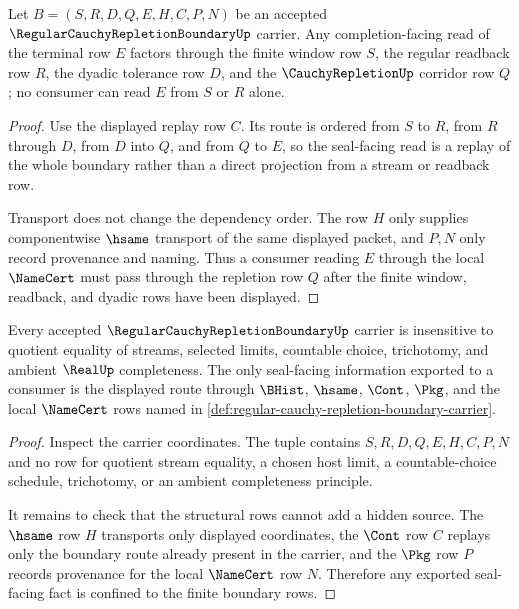 \begin{theorem}
\label{thm:regular-cauchy-repletion-boundary-window-repletion}
Let $B=(S,R,D,Q,E,H,C,P,N)$ be an accepted $\RegularCauchyRepletionBoundaryUp$ carrier. Any completion-facing read of the terminal row $E$ factors through the finite window row $S$, the regular readback row $R$, the dyadic tolerance row $D$, and the $\CauchyRepletionUp$ corridor row $Q$; no consumer can read $E$ from $S$ or $R$ alone.
\end{theorem}
\begin{proof}
Use the displayed replay row $C$. Its route is ordered from $S$ to $R$, from $R$ through $D$, from $D$ into $Q$, and from $Q$ to $E$, so the seal-facing read is a replay of the whole boundary rather than a direct projection from a stream or readback row.

Transport does not change the dependency order. The row $H$ only supplies componentwise $\hsame$ transport of the same displayed packet, and $P,N$ only record provenance and naming. Thus a consumer reading $E$ through the local $\NameCert$ must pass through the repletion row $Q$ after the finite window, readback, and dyadic rows have been displayed.
\end{proof}

\begin{theorem}
\label{thm:regular-cauchy-repletion-boundary-nonescape}
Every accepted $\RegularCauchyRepletionBoundaryUp$ carrier is insensitive to quotient equality of streams, selected limits, countable choice, trichotomy, and ambient $\RealUp$ completeness. The only seal-facing information exported to a consumer is the displayed route through $\BHist$, $\hsame$, $\Cont$, $\Pkg$, and the local $\NameCert$ rows named in \autoref{def:regular-cauchy-repletion-boundary-carrier}.
\end{theorem}
\begin{proof}
Inspect the carrier coordinates. The tuple contains $S,R,D,Q,E,H,C,P,N$ and no row for quotient stream equality, a chosen host limit, a countable-choice schedule, trichotomy, or an ambient completeness principle.

It remains to check that the structural rows cannot add a hidden source. The $\hsame$ row $H$ transports only displayed coordinates, the $\Cont$ row $C$ replays only the boundary route already present in the carrier, and the $\Pkg$ row $P$ records provenance for the local $\NameCert$ row $N$. Therefore any exported seal-facing fact is confined to the finite boundary rows.
\end{proof}

